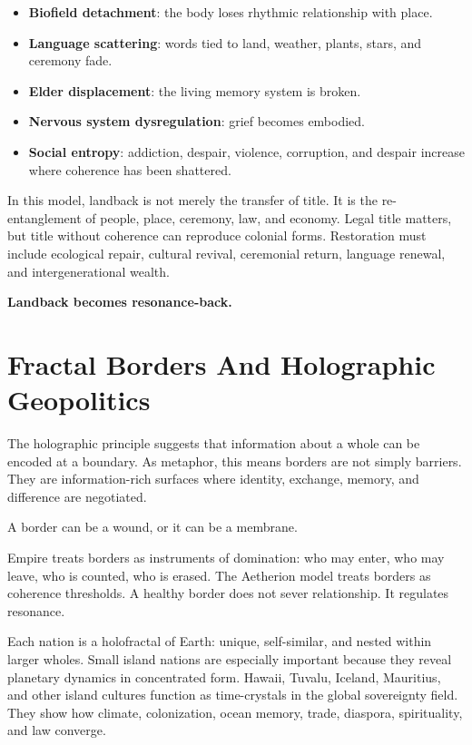 \documentclass[12pt]{article}
\begin{document}
\begin{itemize}
  \item \textbf{Biofield detachment}: the body loses rhythmic relationship with place.
  \item \textbf{Language scattering}: words tied to land, weather, plants, stars, and ceremony fade.
  \item \textbf{Elder displacement}: the living memory system is broken.
  \item \textbf{Nervous system dysregulation}: grief becomes embodied.
  \item \textbf{Social entropy}: addiction, despair, violence, corruption, and despair increase where coherence has been shattered.
\end{itemize}

In this model, landback is not merely the transfer of title. It is the re-entanglement of people, place, ceremony, law, and economy. Legal title matters, but title without coherence can reproduce colonial forms. Restoration must include ecological repair, cultural revival, ceremonial return, language renewal, and intergenerational wealth.

\begin{center}
\textbf{Landback becomes resonance-back.}
\end{center}

\section{Fractal Borders And Holographic Geopolitics}

The holographic principle suggests that information about a whole can be encoded at a boundary. As metaphor, this means borders are not simply barriers. They are information-rich surfaces where identity, exchange, memory, and difference are negotiated.

A border can be a wound, or it can be a membrane.

Empire treats borders as instruments of domination: who may enter, who may leave, who is counted, who is erased. The Aetherion model treats borders as coherence thresholds. A healthy border does not sever relationship. It regulates resonance.

Each nation is a holofractal of Earth: unique, self-similar, and nested within larger wholes. Small island nations are especially important because they reveal planetary dynamics in concentrated form. Hawaii, Tuvalu, Iceland, Mauritius, and other island cultures function as time-crystals in the global sovereignty field. They show how climate, colonization, ocean memory, trade, diaspora, spirituality, and law converge.
\end{document}
